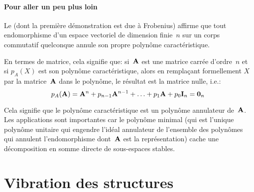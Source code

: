 \medskip
{}
\paragraph{Pour aller un peu plus loin}
Le  (dont la première démonstration est due à Frobenius) affirme que tout endomorphisme d'un espace vectoriel de dimension finie~$n$ sur un corps commutatif quelconque annule son propre polynôme caractéristique.

En termes de matrice, cela signifie que: si~$\MM{A}$ est une matrice carrée d'ordre~$n$ et si $p_A(X)$ est son polynôme caractéristique, alors en remplaçant formellement $X$ par la matrice~$\MM{A}$ dans le polynôme, le résultat est la matrice nulle, i.e.:
\begin{equation}p_A(\MM{A})= \MM{A}^n + p_{n-1}\MM{A}^{n-1} + \ldots + p_1 \MM{A} + p_0 \MM{I}_n = \MM{0}_n \end{equation}

Cela signifie que le polynôme caractéristique est un
polynôme annulateur de~$\MM{A}$. Les applications sont importantes car le polynôme minimal (qui est l'unique polynôme unitaire qui engendre l'idéal annulateur de l'ensemble des polynômes qui annulent l'endomorphisme dont~$\MM{A}$ est la représentation) cache une décomposition en somme directe de sous-espaces stables.








\medskip
\section{Vibration des structures}

